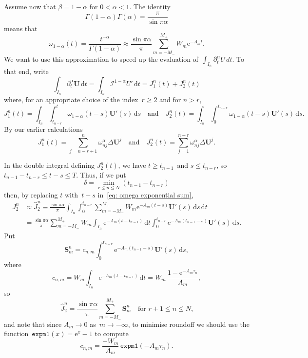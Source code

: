 \documentclass[a4paper,12pt]{article}
\newcommand{\bs}[1]{\boldsymbol{#1}}
\newcommand{\ud}{\mathrm{d}}
\newcommand{\ue}{\mathrm{e}}
\begin{document}
Assume now that $\beta=1-\alpha$ for $0<\alpha<1$.  The identity
\[
\Gamma(1-\alpha)\Gamma(\alpha)=\frac{\pi}{\sin\pi\alpha}
\]
means that
\begin{equation}\label{eq: omega exponential sum}
\omega_{1-\alpha}(t)=\frac{t^{-\alpha}}{\Gamma(1-\alpha)}
    \approx\frac{\sin\pi\alpha}{\pi}\sum_{m=-M_-}^{M_+}W_m\ue^{-A_mt}.
\end{equation}
We want to use this approximation to speed up the evaluation
of~$\int_{I_n}\partial_t^\alpha U\,dt$.  To that end, write
\[
\int_{I_n}\partial_t^\alpha\bs{U}\,\ud t
    =\int_{I_n}\mathcal{I}^{1-\alpha}U'\,\ud t=J^n_1(t)+J^n_2(t)
\]
where, for an appropriate choice of the index~$r\ge2$ and for $n>r$,
\[
J^n_1(t)=\int_{I_n}\int_{t_{n-r}}^t\omega_{1-\alpha}(t-s)\bs{U}'(s)\,\ud s
\quad\text{and}\quad
J^n_2(t)=\int_{I_n}\int_0^{t_{n-r}}\omega_{1-\alpha}(t-s)\bs{U}'(s)\,\ud s.
\]
By our earlier calculations
\[
J_1^n(t)=\sum_{j=n-r+1}^n \omega^\alpha_{nj}\Delta\bs{U}^j
\quad\text{and}\quad
J_2^n(t)=\sum_{j=1}^{n-r}\omega^\alpha_{nj}\Delta\bs{U}^j.
\]

In the double integral defining $J^n_2(t)$, we have $t\ge t_{n-1}$~and
$s\le t_{n-r}$, so $t_{n-1}-t_{n-r}\le t-s\le T$.  Thus, if we put
\[
\delta=\min_{r\le n\le N}(t_{n-1}-t_{n-r})
\]
then, by replacing $t$ with~$t-s$ in~\eqref{eq: omega exponential sum},
\begin{align*}
J_2^n&\approx \hat J_2^n\equiv\frac{\sin\pi\alpha}{\pi}\int_{I_n}
    \int_0^{t_{n-r}}\sum_{m=-M_-}^{M_+}
        W_m\ue^{-A_m(t-s)}\bs{U}'(s)\,\ud s\,\ud t\\
    &=\frac{\sin\pi\alpha}{\pi}\sum_{m=-M_-}^{M_+}W_m
    \int_{I_n}\ue^{-A_m(t-t_{n-1})}\,\ud t
    \int_0^{t_{n-r}}\ue^{-A_m(t_{n-1}-s)}\bs{U}'(s)\,\ud s.
\end{align*}
Put
\[
\bs{S}^n_m= c_{n,m}\int_0^{t_{n-r}}\ue^{-A_m(t_{n-1}-s)}\bs{U}'(s)\,\ud s,
\]
where
\[
c_{n,m}=W_m\int_{I_n}\ue^{-A_m(t-t_{n-1})}\,\ud t
    =W_m\,\frac{1-\ue^{-A_m\tau_n}}{A_m},
\]
so
\[
\hat J^n_2=\frac{\sin\pi\alpha}{\pi}\sum_{m=-M_-}^{M_+}\bs{S}^n_m
    \quad\text{for $r+1\le n\le N$,}
\]
and note that since $A_m\to0$ as~$m\to-\infty$, to minimise roundoff we should
use the function~$\mathtt{expm1}(x)=\ue^x-1$ to compute
\[
c_{n,m}=\frac{-W_m}{A_m}\,\mathtt{expm1}(-A_m\tau_n).
\]
\end{document}
